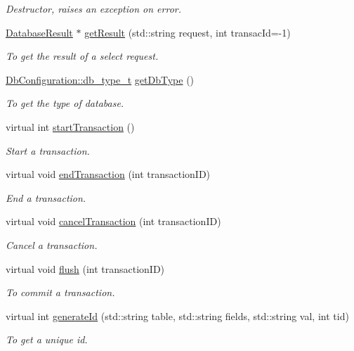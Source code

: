 \begin{DoxyCompactItemize}
\begin{DoxyCompactList}\small\item\em Destructor, raises an exception on error. \item\end{DoxyCompactList}\item 
\hyperlink{classDatabaseResult}{DatabaseResult} $\ast$ \hyperlink{classMYSQLDatabase_a69bbd3724ec02ae9230e558254a3648e}{getResult} (std::string request, int transacId=-\/1)
\begin{DoxyCompactList}\small\item\em To get the result of a select request. \item\end{DoxyCompactList}\item 
\hyperlink{classDbConfiguration_a4a57e43a5017a5c4833a784a994c91cf}{DbConfiguration::db\_\-type\_\-t} \hyperlink{classMYSQLDatabase_a6002562a486bc8a4c5a820cf45a62e64}{getDbType} ()
\begin{DoxyCompactList}\small\item\em To get the type of database. \item\end{DoxyCompactList}\item 
virtual int \hyperlink{classMYSQLDatabase_a7c460d606e90494efd0895d8b420b080}{startTransaction} ()
\begin{DoxyCompactList}\small\item\em Start a transaction. \item\end{DoxyCompactList}\item 
virtual void \hyperlink{classMYSQLDatabase_a5b2543618f1468649e52ec6e86a80ccb}{endTransaction} (int transactionID)
\begin{DoxyCompactList}\small\item\em End a transaction. \item\end{DoxyCompactList}\item 
virtual void \hyperlink{classMYSQLDatabase_aafb2ffadceed8006db24a247032dbbdb}{cancelTransaction} (int transactionID)
\begin{DoxyCompactList}\small\item\em Cancel a transaction. \item\end{DoxyCompactList}\item 
virtual void \hyperlink{classMYSQLDatabase_a722f4a93562ae658142fb5cbae3ee8e2}{flush} (int transactionID)
\begin{DoxyCompactList}\small\item\em To commit a transaction. \item\end{DoxyCompactList}\item 
virtual int \hyperlink{classMYSQLDatabase_ad8947cf6f7b1922f0d7cfc7d23d6b783}{generateId} (std::string table, std::string fields, std::string val, int tid)
\begin{DoxyCompactList}\small\item\em To get a unique id. \item\end{DoxyCompactList}\end{DoxyCompactItemize}
